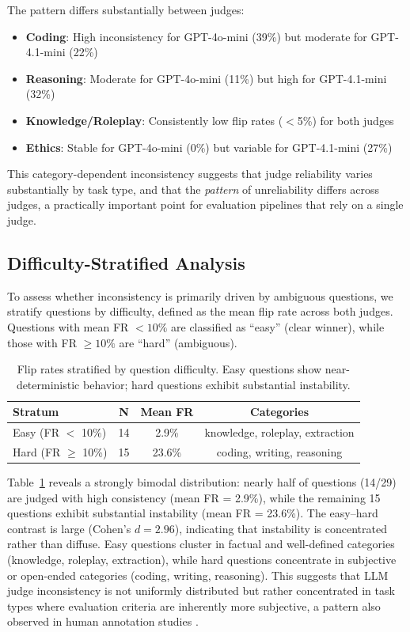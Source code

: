\documentclass{ijclclp}
\begin{document}
The pattern differs substantially between judges:

\begin{itemize}[nosep]
    \item \textbf{Coding}: High inconsistency for GPT-4o-mini (39\%) but moderate for GPT-4.1-mini (22\%)
    \item \textbf{Reasoning}: Moderate for GPT-4o-mini (11\%) but high for GPT-4.1-mini (32\%)
    \item \textbf{Knowledge/Roleplay}: Consistently low flip rates ($<$5\%) for both judges
    \item \textbf{Ethics}: Stable for GPT-4o-mini (0\%) but variable for GPT-4.1-mini (27\%)
\end{itemize}

This category-dependent inconsistency suggests that judge reliability varies substantially by task type, and that the \textit{pattern} of unreliability differs across judges, a practically important point for evaluation pipelines that rely on a single judge.

\subsection{Difficulty-Stratified Analysis}

To assess whether inconsistency is primarily driven by ambiguous questions, we stratify questions by difficulty, defined as the mean flip rate across both judges. Questions with mean FR $< 10\%$ are classified as ``easy'' (clear winner), while those with FR $\geq 10\%$ are ``hard'' (ambiguous).

\begin{table}[h]
\centering
\caption{Flip rates stratified by question difficulty. Easy questions show near-deterministic behavior; hard questions exhibit substantial instability.}
\label{tab:difficulty}
\begin{tabular}{lccc}
\toprule
\textbf{Stratum} & \textbf{N} & \textbf{Mean FR} & \textbf{Categories} \\
\midrule
Easy (FR $<$ 10\%) & 14 & 2.9\% & knowledge, roleplay, extraction \\
Hard (FR $\geq$ 10\%) & 15 & 23.6\% & coding, writing, reasoning \\
\bottomrule
\end{tabular}
\end{table}

Table~\ref{tab:difficulty} reveals a strongly bimodal distribution: nearly half of questions (14/29) are judged with high consistency (mean FR = 2.9\%), while the remaining 15 questions exhibit substantial instability (mean FR = 23.6\%). The easy--hard contrast is large (Cohen's $d = 2.96$), indicating that instability is concentrated rather than diffuse. Easy questions cluster in factual and well-defined categories (knowledge, roleplay, extraction), while hard questions concentrate in subjective or open-ended categories (coding, writing, reasoning). This suggests that LLM judge inconsistency is not uniformly distributed but rather concentrated in task types where evaluation criteria are inherently more subjective, a pattern also observed in human annotation studies \citep{amidei2019agreement}.
\end{document}
